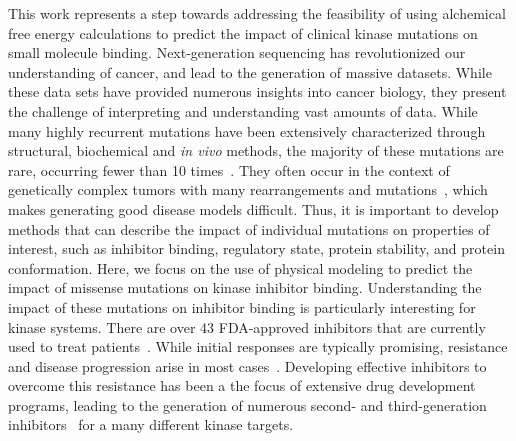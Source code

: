 \documentclass[phd,tocprelim]{cornell}
\begin{document}
\medskip
This work represents a step towards addressing the feasibility of using alchemical free energy calculations to predict the impact of clinical kinase mutations on small molecule binding. Next-generation sequencing has revolutionized our understanding of cancer, and lead to the generation of massive datasets. While these data sets have provided numerous insights into cancer biology, they present the challenge of interpreting and understanding vast amounts of data. While many highly recurrent mutations have been extensively characterized through structural, biochemical and \emph{in vivo} methods, the majority of these mutations are rare, occurring fewer than 10 times~\citep{Hauser:2018vz}. They often occur in the context of genetically complex tumors with many rearrangements and mutations~\citep{Zehir:2017ib}, which makes generating good disease models difficult.  Thus, it is important to develop methods that can describe the impact of individual mutations on properties of interest, such as inhibitor binding, regulatory state, protein stability, and protein conformation. Here, we focus on the use of physical modeling to predict the impact of missense mutations on kinase inhibitor binding. Understanding the impact of these mutations on inhibitor binding is particularly interesting for kinase systems. There are over 43 FDA-approved inhibitors that are currently used to treat patients~\citep{fda-approved-kinase-inhibitors}. While initial responses are typically promising, resistance and disease progression arise in most cases~\citep{knight-shokat:2005:chem-biol:selective-kinase-inhibitors,Pao:2005dp,Pao2004-kx}. Developing effective inhibitors to overcome this resistance has been a the focus of extensive drug development programs, leading to the generation of numerous second- and third-generation inhibitors~\citep{Chuang:2016jw,Tan:2018de,Gainor:2016ep} for a many different kinase targets. 
\end{document}
